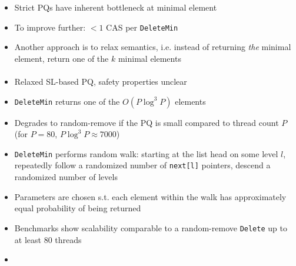 \documentclass[usenames,dvipsnames]{beamer}
\begin{document}
\begin{frame}{}

\begin{itemize}
\item Strict \acp{PQ} have inherent bottleneck at minimal element
\item To improve further: $< 1$ \ac{CAS} per \lstinline|DeleteMin|
\item Another approach is to relax semantics, i.e. instead of returning \emph{the} minimal element,
      return one of the $k$ minimal elements
\end{itemize}
\end{frame}

\begin{frame}{}
\framesubtitle{\citeauthor{alistarhspraylist}}

\begin{itemize}
\item Relaxed \ac{SL}-based \ac{PQ}, safety properties unclear
\item \lstinline|DeleteMin| returns one of the $O(P \log^3 P)$ elements
\item Degrades to random-remove if the \ac{PQ} is small compared to thread count $P$ (for $P = 80$,
      $P \log^3 P \approx 7000$)
\item \lstinline|DeleteMin| performs random walk: starting at the list head on some level $l$,
      repeatedly follow a randomized number of \lstinline|next[l]| pointers, descend a randomized
      number of levels
\item Parameters are chosen s.t. each element within the walk has approximately equal probability
      of being returned
\item Benchmarks show scalability comparable to a random-remove \lstinline|Delete| up to at
      least 80 threads
\item {}
\end{itemize}
\end{frame}
\end{document}
